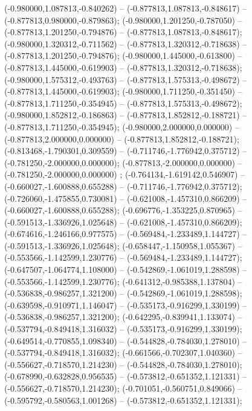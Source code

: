  (-0.980000,1.087813,-0.840262) -- (-0.877813,1.087813,-0.848617) -- (-0.877813,0.980000,-0.879863);
 (-0.980000,1.201250,-0.787050) -- (-0.877813,1.201250,-0.794876) -- (-0.877813,1.087813,-0.848617);
 (-0.980000,1.320312,-0.711562) -- (-0.877813,1.320312,-0.718638) -- (-0.877813,1.201250,-0.794876);
 (-0.980000,1.445000,-0.613800) -- (-0.877813,1.445000,-0.619903) -- (-0.877813,1.320312,-0.718638);
 (-0.980000,1.575312,-0.493763) -- (-0.877813,1.575313,-0.498672) -- (-0.877813,1.445000,-0.619903);
 (-0.980000,1.711250,-0.351450) -- (-0.877813,1.711250,-0.354945) -- (-0.877813,1.575313,-0.498672);
 (-0.980000,1.852812,-0.186863) -- (-0.877813,1.852812,-0.188721) -- (-0.877813,1.711250,-0.354945);
 (-0.980000,2.000000,0.000000) -- (-0.877813,2.000000,0.000000) -- (-0.877813,1.852812,-0.188721);
 (-0.813468,-1.790301,0.309559) -- (-0.711746,-1.776942,0.375712) -- (-0.781250,-2.000000,0.000000);
 (-0.877813,-2.000000,0.000000) -- (-0.781250,-2.000000,0.000000) ;
 (-0.764134,-1.619142,0.546907) -- (-0.660027,-1.600888,0.655288) -- (-0.711746,-1.776942,0.375712);
 (-0.726060,-1.475855,0.730081) -- (-0.621008,-1.457310,0.866209) -- (-0.660027,-1.600888,0.655288);
 (-0.696776,-1.353225,0.870965) -- (-0.591513,-1.336926,1.025648) -- (-0.621008,-1.457310,0.866209);
 (-0.674616,-1.246166,0.977575) -- (-0.569484,-1.233489,1.144727) -- (-0.591513,-1.336926,1.025648);
 (-0.658447,-1.150958,1.055367) -- (-0.553566,-1.142599,1.230776) -- (-0.569484,-1.233489,1.144727);
 (-0.647507,-1.064774,1.108000) -- (-0.542869,-1.061019,1.288598) -- (-0.553566,-1.142599,1.230776);
 (-0.641312,-0.985388,1.137804) -- (-0.536838,-0.986257,1.321200) -- (-0.542869,-1.061019,1.288598);
 (-0.639598,-0.910971,1.146047) -- (-0.535173,-0.916299,1.330199) -- (-0.536838,-0.986257,1.321200);
 (-0.642295,-0.839941,1.133074) -- (-0.537794,-0.849418,1.316032) -- (-0.535173,-0.916299,1.330199);
 (-0.649514,-0.770855,1.098340) -- (-0.544828,-0.784030,1.278010) -- (-0.537794,-0.849418,1.316032);
 (-0.661566,-0.702307,1.040360) -- (-0.556627,-0.718570,1.214230) -- (-0.544828,-0.784030,1.278010);
 (-0.678990,-0.632828,0.956535) -- (-0.573812,-0.651352,1.121331) -- (-0.556627,-0.718570,1.214230);
 (-0.701051,-0.560751,0.849066) -- (-0.595792,-0.580563,1.001268) -- (-0.573812,-0.651352,1.121331);
